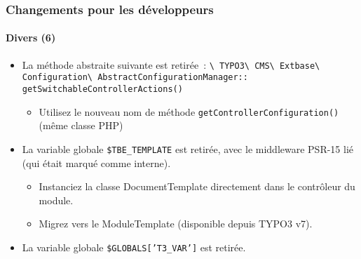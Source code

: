 \begin{frame}[fragile]
	\frametitle{Changements pour les développeurs}
	\framesubtitle{Divers (6)}

	\begin{itemize}

		\item La méthode abstraite suivante est retirée~:\newline
			\smaller
				\texttt{\textbackslash
					TYPO3\textbackslash
					CMS\textbackslash
					Extbase\textbackslash
					Configuration\textbackslash
					AbstractConfigurationManager::}\newline
					\texttt{getSwitchableControllerActions()}
			\normalsize

			\begin{itemize}\smaller
				\item[\ding{228}] Utilisez le nouveau nom de méthode \texttt{getControllerConfiguration()} (même classe PHP)
			\end{itemize}\normalsize

		\item La variable globale \texttt{\$TBE\_TEMPLATE} est retirée, avec le middleware PSR-15 lié (qui était marqué comme interne).

			\begin{itemize}\smaller
				\item[\ding{228}] Instanciez la classe DocumentTemplate directement dans le contrôleur du module.
				\item[\ding{228}] Migrez vers le ModuleTemplate (disponible depuis TYPO3 v7).
			\end{itemize}\normalsize

		\item La variable globale \texttt{\$GLOBALS['T3\_VAR']} est retirée.\newline

	\end{itemize}

\end{frame}

